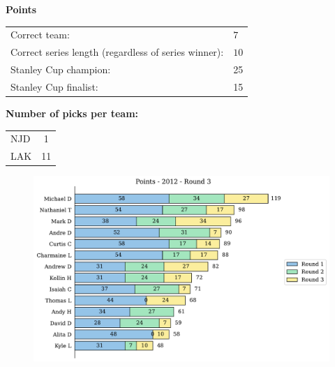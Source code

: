 \documentclass[10pt]{article}
\begin{document}
{\bf Points}\\
\begin{minipage}{12cm}
    \begin{tabular}{l l}
        Correct team:	& $7$\\
        Correct series length (regardless of series winner):	& $10$\\
        Stanley Cup champion:	& 25\\
        Stanley Cup finalist:	& 15\\
    \end{tabular}

    \vspace{1cm}
    {\bf Number of picks per team:}\\
    \begin{tabular}{lc }
        NJD & 1 \\
        LAK & 11 \\
    \end{tabular}
\end{minipage}
\begin{minipage}[t]{13cm}
    \begin{figure}[H]
        \vspace{-2.5cm}
        \includegraphics[width=13cm]{../../figures/2012/Points-2012-Round3.pdf}
    \end{figure}
\end{minipage}
\end{document}
